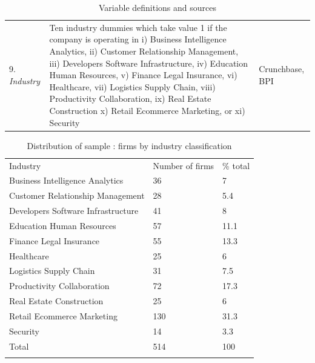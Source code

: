 \documentclass[12pt]{article}
\begin{document}
\begin{table} [ht]
\begin{tabularx}{\textwidth}{ p{5cm} p{7cm} p{2.2cm} }
9. \textit{Industry} & Ten industry dummies which take value 1 if the company is operating in i) Business Intelligence Analytics, ii) Customer Relationship Management, iii) Developers Software Infrastructure, iv) Education Human Resources, v) Finance Legal Insurance, vi) Healthcare, vii) Logistics Supply Chain, viii) Productivity Collaboration, ix) Real Estate Construction x) Retail Ecommerce Marketing, or xi) Security & Crunchbase, BPI \\
\cmidrule(r){1-3}
\end{tabularx}
\caption{Variable definitions and sources}
\label{table1}
\end{table}


\begin{table} [ht]
\begin{spacing}{0.75}
\scriptsize
\renewcommand{\arraystretch}{1.5}
\begin{tabularx}{\textwidth}{ p{10cm} p{1.5cm} p{1.5cm} }
\toprule
\multicolumn{1}{l}{Industry}&\multicolumn{1}{l}{Number of firms}&\multicolumn{1}{l}{\% total}\\
\cmidrule(r){2-3}
Business Intelligence Analytics & 36 & 7 \\
Customer Relationship Management & 28 & 5.4 \\
Developers Software Infrastructure & 41 & 8 \\
Education Human Resources & 57 & 11.1 \\
Finance Legal Insurance & 55 & 13.3 \\
Healthcare & 25 & 6 \\
Logistics Supply Chain & 31 & 7.5 \\
Productivity Collaboration & 72 & 17.3 \\
Real Estate Construction & 25 & 6 \\
Retail Ecommerce Marketing & 130 & 31.3 \\
Security & 14 & 3.3 \\
\cmidrule(r){2-3}
Total & 514 & 100 \\
 & & \\
\end{tabularx}
\label{table2}
\caption{Distribution of sample : firms by industry classification}
\end{spacing}
\end{table}
\end{document}
